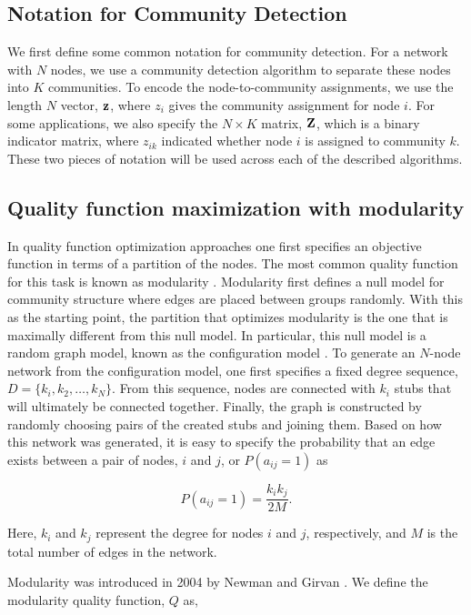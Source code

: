 \subsection{Notation for Community Detection}
We first define some common notation for community detection. For a network with $N$ nodes, we use a community detection algorithm to separate these nodes into $K$ communities. To encode the node-to-community assignments, we use the length $N$ vector, ${\bf z}$, where $z_{i}$ gives the community assignment for node $i$. For some applications, we also specify the $N \times K$ matrix, ${\bf Z}$, which is a binary indicator matrix, where $z_{ik}$ indicated whether node $i$ is assigned to community $k$. These two pieces of notation will be used across each of the described algorithms. 

\subsection{Quality function maximization with modularity}
\indent In quality function optimization approaches one first specifies an objective function in terms of a partition of the nodes. The most common quality function for this task is known as modularity \cite{newman2006modularity}. Modularity first defines a null model for community structure where edges are placed between groups randomly. With this as the starting point, the partition that optimizes modularity is the one that is maximally different from this null model. In particular, this null model is a random graph model, known as the configuration model \cite{benderCanfield}. To generate an $N$-node network from the configuration model, one first specifies a fixed degree sequence, $D=\{k_{i},k_{2},\dots,k_{N}\}$. From this sequence, nodes are connected with $k_{i}$ stubs that will ultimately be connected together. Finally, the graph is constructed by randomly choosing pairs of the created stubs and joining them. Based on how this network was generated, it is easy to specify the probability that an edge exists between a pair of nodes, $i$ and $j$, or $P(a_{ij}=1)$ as

\begin{equation}
P(a_{ij}=1)=\frac{k_{i}k_{j}}{2M}.
\end{equation}

Here, $k_{i}$ and $k_{j}$ represent the degree for nodes $i$ and $j$, respectively, and $M$ is the total number of edges in the network. 

\indent Modularity was introduced in 2004 by Newman and Girvan \cite{newmangirvan}. We define the modularity quality function, $Q$ as,

